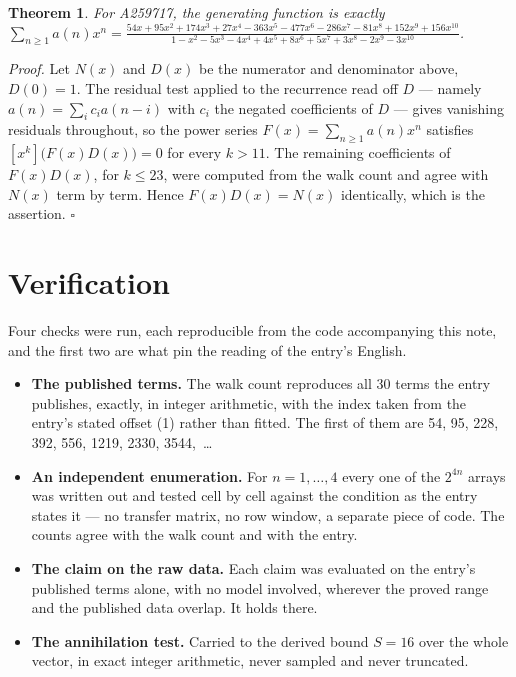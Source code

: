 \documentclass[11pt]{article}
\newtheorem{theorem}{Theorem}
\theoremstyle{definition}
\begin{document}
\begin{theorem} For A259717, the generating function is exactly $\sum_{n\ge 1} a(n)x^n = \frac{54x + 95x^{2} + 174x^{3} + 27x^{4} - 363x^{5} - 477x^{6} - 286x^{7} - 81x^{8} + 152x^{9} + 156x^{10}}{1 - x^{2} - 5x^{3} - 4x^{4} + 4x^{5} + 8x^{6} + 5x^{7} + 3x^{8} - 2x^{9} - 3x^{10}}$.\end{theorem}

{\itshape Proof.} Let $N(x)$ and $D(x)$ be the numerator and denominator above, $D(0)=1$. The residual test applied to the recurrence read off $D$ --- namely $a(n) = \sum_i c_i a(n-i)$ with $c_i$ the negated coefficients of $D$ --- gives vanishing residuals throughout, so the power series $F(x)=\sum_{n\ge 1}a(n)x^n$ satisfies $[x^k]\bigl(F(x)D(x)\bigr) = 0$ for every $k > 11$. The remaining coefficients of $F(x)D(x)$, for $k \le 23$, were computed from the walk count and agree with $N(x)$ term by term. Hence $F(x)D(x) = N(x)$ identically, which is the assertion. $\square$

\section{Verification}

Four checks were run, each reproducible from the code accompanying this note, and the first two are what pin the reading of the entry's English.

\begin{itemize}

\item {\bfseries The published terms.} The walk count reproduces all 30 terms the entry publishes, exactly, in integer arithmetic, with the index taken from the entry's stated offset (1) rather than fitted. The first of them are 54, 95, 228, 392, 556, 1219, 2330, 3544,~\dots

\item {\bfseries An independent enumeration.} For $n = 1,\dots,4$ every one of the $2^{4n}$ arrays was written out and tested cell by cell against the condition as the entry states it --- no transfer matrix, no row window, a separate piece of code. The counts agree with the walk count and with the entry.

\item {\bfseries The claim on the raw data.} Each claim was evaluated on the entry's published terms alone, with no model involved, wherever the proved range and the published data overlap. It holds there.

\item {\bfseries The annihilation test.} Carried to the derived bound $S = 16$ over the whole vector, in exact integer arithmetic, never sampled and never truncated.

\end{itemize}
\end{document}
